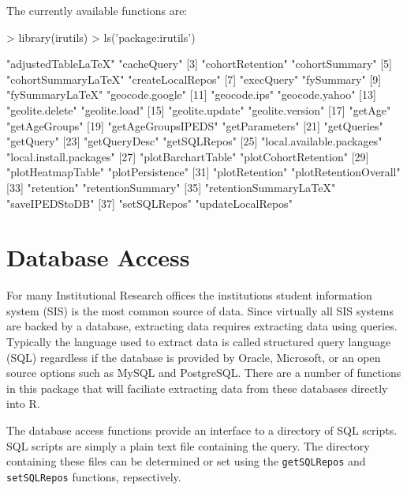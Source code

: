 \documentclass[letterpaper,11pt]{article}
\begin{document}
The currently available functions are:
\begin{Schunk}
\begin{Sinput}
> library(irutils)
> ls('package:irutils')
\end{Sinput}
\begin{Soutput}
 [1] "adjustedTableLaTeX"       "cacheQuery"              
 [3] "cohortRetention"          "cohortSummary"           
 [5] "cohortSummaryLaTeX"       "createLocalRepos"        
 [7] "execQuery"                "fySummary"               
 [9] "fySummaryLaTeX"           "geocode.google"          
[11] "geocode.ips"              "geocode.yahoo"           
[13] "geolite.delete"           "geolite.load"            
[15] "geolite.update"           "geolite.version"         
[17] "getAge"                   "getAgeGroups"            
[19] "getAgeGroupsIPEDS"        "getParameters"           
[21] "getQueries"               "getQuery"                
[23] "getQueryDesc"             "getSQLRepos"             
[25] "local.available.packages" "local.install.packages"  
[27] "plotBarchartTable"        "plotCohortRetention"     
[29] "plotHeatmapTable"         "plotPersistence"         
[31] "plotRetention"            "plotRetentionOverall"    
[33] "retention"                "retentionSummary"        
[35] "retentionSummaryLaTeX"    "saveIPEDStoDB"           
[37] "setSQLRepos"              "updateLocalRepos"        
\end{Soutput}
\end{Schunk}



\section{Database Access}

For many Institutional Research offices the institutions student information system (SIS) is the most common source of data. Since virtually all SIS systems are backed by a database, extracting data requires extracting data using queries. Typically the language used to extract data is called structured query language (SQL) regardless if the database is provided by Oracle, Microsoft, or an open source options such as MySQL and PostgreSQL. There are a number of functions in this package that will faciliate extracting data from these databases directly into R.

The database access functions provide an interface to a directory of SQL scripts. SQL scripts are simply a plain text file containing the query. The directory containing these files can be determined or set using the \texttt{getSQLRepos} and \texttt{setSQLRepos} functions, repsectively. 
\end{document}
